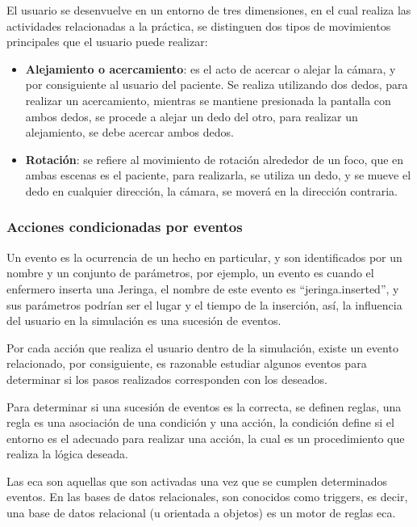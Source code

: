 El usuario se desenvuelve en un entorno de tres dimensiones, en el cual realiza las
actividades relacionadas a la práctica, se distinguen dos tipos de movimientos
principales que el usuario puede realizar:

\begin{itemize}
    \item \textbf{Alejamiento o acercamiento}: es el acto de acercar o alejar la
        cámara, y por consiguiente al usuario del paciente. Se realiza
        utilizando dos dedos, para realizar un acercamiento, mientras se
        mantiene presionada la pantalla con ambos dedos, se procede a alejar un
        dedo del otro, para realizar un alejamiento, se debe acercar ambos
        dedos.
    \item \textbf{Rotación}: se refiere al movimiento de rotación alrededor de
        un foco, que en ambas escenas es el paciente, para realizarla, se utiliza
        un dedo, y se mueve el dedo en cualquier dirección, la cámara, se moverá
        en la dirección contraria.
\end{itemize}


\subsubsection{Acciones condicionadas por eventos}

Un evento es la ocurrencia de un hecho en particular, y son identificados por un
nombre y un conjunto de parámetros, por ejemplo, un evento es cuando el
enfermero inserta una Jeringa, el nombre de este evento es
\enquote{jeringa.inserted}, y sus parámetros podrían ser el lugar y el tiempo de
la inserción, así, la influencia del usuario en la simulación es una sucesión de
eventos.

Por cada acción que realiza el usuario dentro de la simulación, existe un evento
relacionado, por consiguiente, es razonable estudiar algunos eventos para
determinar si los pasos realizados corresponden con los deseados. 

Para determinar si una sucesión de eventos es la correcta, se definen reglas,
una regla es una asociación de una condición y una acción, la condición define
si el entorno es el adecuado para realizar una acción, la cual es un
procedimiento que realiza la lógica deseada.

Las \gls{eca} son aquellas que son activadas una vez que se cumplen determinados
eventos\cite{bailey2004event}. En las bases de datos relacionales, son conocidos
como triggers, es decir, una base de datos relacional (u orientada a objetos) es
un motor de reglas \gls{eca}\cite{bailey2004event}\cite{behrends2006combining}.

